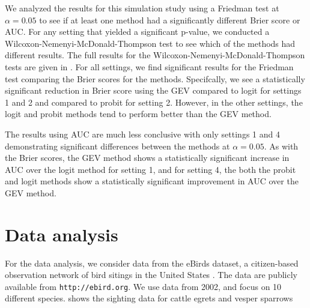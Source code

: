 \documentclass[11pt]{article}
\begin{document}
We analyzed the results for this simulation study using a Friedman test at $\alpha = 0.05$ to see if at least one method had a significantly different Brier score or AUC.
For any setting that yielded a significant p-value, we conducted a Wilcoxon-Nemenyi-McDonald-Thompson test to see which of the methods had different results.
The full results for the Wilcoxon-Nemenyi-McDonald-Thompson tests are given in .
For all settings, we find significant results for the Friedman test comparing the Brier scores for the methods.
Specifcally, we see a statistically significant reduction in Brier score using the GEV compared to logit for settings 1 and 2 and compared to probit for setting 2.
However, in the other settings, the logit and probit methods tend to perform better than the GEV method.

The results using AUC are much less conclusive with only settings 1 and 4 demonstrating significant differences between the methods at $\alpha = 0.05$.
As with the Brier scores, the GEV method shows a statistically significant increase in AUC over the logit method for setting 1, and for setting 4, the both the probit and logit methods show a statistically significant improvement in AUC over the GEV method.




\section{Data analysis}\label{rbs:analysis}
For the data analysis, we consider data from the eBirds dataset, a citizen-based observation network of bird sitings in the United States \citep{Sullivan2009}.
The data are publicly available from {\tt http://ebird.org}.
We use data from 2002, and focus on 10 different species.
 shows the sighting data for cattle egrets and vesper sparrows
\end{document}
